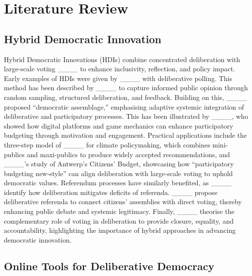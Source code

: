 \section{Literature Review}
\subsection{Hybrid Democratic Innovation}

Hybrid Democratic Innovations (HDIs) combine concentrated deliberation with large-scale voting ____ to enhance inclusivity, reflection, and policy impact. Early examples of HDIs were given by ____ with deliberative polling. This method has been described by ____ to capture informed public opinion through random sampling, structured deliberation, and feedback. Building on this, ____ proposed \enquote{democratic assemblage,} emphasising adaptive systemic integration of deliberative and participatory processes. This has been illustrated by ____, who showed how digital platforms and game mechanics can enhance participatory budgeting through motivation and engagement. Practical applications include the three-step model of ____ for climate policymaking, which combines mini-publics and maxi-publics to produce widely accepted recommendations, and ____’s study of Antwerp’s Citizens’ Budget, showcasing how \enquote{participatory budgeting new-style} can align deliberation with large-scale voting to uphold democratic values. Referendum processes have similarly benefited, as ____ identify how deliberation mitigates deficits of referenda. ____ propose deliberative referenda to connect citizens’ assemblies with direct voting, thereby enhancing public debate and systemic legitimacy. Finally, ____ theorise the complementary role of voting in deliberation to provide closure, equality, and accountability, highlighting the importance of hybrid approaches in advancing democratic innovation.

\subsection{Online Tools for Deliberative Democracy}

